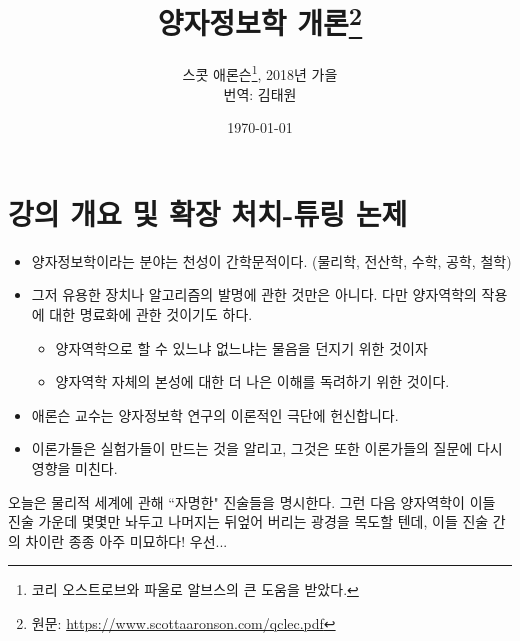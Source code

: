 \documentclass[a4paper,chapter,kosection,atbegshi]{oblivoir}
\begin{document}
\title{양자정보학 개론\thanks{원문: \url{https://www.scottaaronson.com/qclec.pdf}}}
\author{
    스콧 애론슨\thanks{코리 오스트로브와 파울로 알브스의 큰 도움을 받았다.}, 
    2018년 가을\\
    번역: 김태원
}
\date{\today}
\newpage
\maketitle\thispagestyle{empty}\newpage

\tableofcontents

\chapter{강의 개요 및 확장 처치-튜링 논제}
\begin{itemize}[label=\(\blacktriangleright\)]
    \item 양자정보학이라는 분야는 천성이 간학문적이다. (물리학, 전산학, 수학, 공학, 철학)
    \item 그저 유용한 장치나 알고리즘의 발명에 관한 것만은 아니다.
        다만 양자역학의 작용에 대한 명료화에 관한 것이기도 하다.
    \begin{itemize}
        \item 양자역학으로 할 수 있느냐 없느냐는 물음을 던지기 위한 것이자
        \item 양자역학 자체의 본성에 대한 더 나은 이해를 독려하기 위한 것이다.
    \end{itemize}
    \item 애론슨 교수는 양자정보학 연구의 이론적인 극단에 헌신합니다.
    \item 이론가들은 실험가들이 만드는 것을 알리고, 그것은 또한 이론가들의 질문에 다시 영향을 미친다.
\end{itemize}\hfill\break

오늘은 물리적 세계에 관해 ``자명한" 진술들을 명시한다.
그런 다음 양자역학이 이들 진술 가운데 몇몇만 놔두고 나머지는 뒤엎어 버리는 광경을
목도할 텐데, 이들 진술 간의 차이란 종종 아주 미묘하다!
우선...
\end{document}
